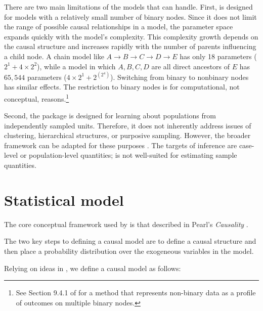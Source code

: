 \documentclass[
  11pt,
  article]{jss}
\begin{document}
There are two main limitations of the models that 
can handle. First,  is designed for models with a
relatively small number of binary nodes. Since it does not limit the
range of possible causal relationships in a model, the parameter space
expands quickly with the model's complexity. This complexity growth
depends on the causal structure and increases rapidly with the number of
parents influencing a child node. A chain model like
\(A \rightarrow B \rightarrow C \rightarrow D \rightarrow E\) has only
18 parameters (\(2^1 + 4\times 2^2\)), while a model in which
\(A, B, C, D\) are all direct ancestors of \(E\) has \(65,544\)
parameters (\(4\times 2^1 + 2^{(2^4)}\)). Switching from binary to
nonbinary nodes has similar effects. The restriction to binary nodes is
for computational, not conceptual, reasons.\footnote{See Section 9.4.1
  of \citet{humphreys_integrated_2023} for a method that represents
  non-binary data as a profile of outcomes on multiple binary nodes.}

Second, the package is designed for learning about populations from
independently sampled units. Therefore, it does not inherently address
issues of clustering, hierarchical structures, or purposive sampling.
However, the broader framework can be adapted for these purposes
\citep[see Section 9.4 of][]{humphreys_integrated_2023}. The targets of
inference are case-level or population-level quantities;
 is not well-suited for estimating sample quantities.

\section{Statistical model}\label{sec-theory}

The core conceptual framework used by  is that
described in Pearl's \emph{Causality} \citep{pearl_causality_2009}.

The two key steps to defining a causal model are to define a causal
structure and then place a probability distribution over the exogeneous
variables in the model.

Relying on ideas in \citeauthor{pearl_causality_2009}
\citetext{\citeyear{pearl_causality_2009}; \citealp[with notation
from][]{humphreys_integrated_2023}}, we define a causal model as
follows:
\end{document}

